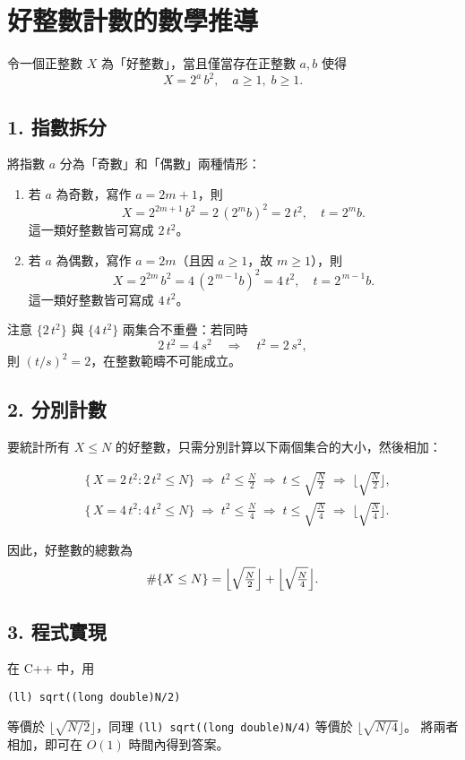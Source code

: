 \section*{好整數計數的數學推導}

令一個正整數 $X$ 為「好整數」，當且僅當存在正整數 $a,b$ 使得
\[
X = 2^a \, b^2,\quad a\ge1,\;b\ge1.
\]

\subsection*{1. 指數拆分}

將指數 $a$ 分為「奇數」和「偶數」兩種情形：

\begin{enumerate}
  \item 若 $a$ 為奇數，寫作 $a=2m+1$，則
    \[
      X = 2^{2m+1}\,b^2
        = 2\,(2^m b)^2
        = 2\,t^2,
      \quad t = 2^m b.
    \]
    這一類好整數皆可寫成 $2\,t^2$。

  \item 若 $a$ 為偶數，寫作 $a=2m$（且因 $a\ge1$，故 $m\ge1$），則
    \[
      X = 2^{2m}\,b^2
        = 4\,(2^{\,m-1}b)^2
        = 4\,t^2,
      \quad t = 2^{\,m-1}b.
    \]
    這一類好整數皆可寫成 $4\,t^2$。
\end{enumerate}

注意 $\{2\,t^2\}$ 與 $\{4\,t^2\}$ 兩集合不重疊：若同時
\[
2\,t^2 = 4\,s^2
\quad\Longrightarrow\quad
t^2 = 2\,s^2,
\]
則 $(t/s)^2=2$，在整數範疇不可能成立。

\subsection*{2. 分別計數}

要統計所有 $X\le N$ 的好整數，只需分別計算以下兩個集合的大小，然後相加：

\[
\begin{aligned}
  &\{\,X=2\,t^2 : 2\,t^2\le N\}
    \;\Longrightarrow\;
    t^2 \le \frac{N}{2}
    \;\Longrightarrow\;
    t \le \sqrt{\frac{N}{2}}
    \;\Longrightarrow\;
    \bigl\lfloor\sqrt{\tfrac{N}{2}}\bigr\rfloor, \\[6pt]
  &\{\,X=4\,t^2 : 4\,t^2\le N\}
    \;\Longrightarrow\;
    t^2 \le \frac{N}{4}
    \;\Longrightarrow\;
    t \le \sqrt{\frac{N}{4}}
    \;\Longrightarrow\;
    \bigl\lfloor\sqrt{\tfrac{N}{4}}\bigr\rfloor.
\end{aligned}
\]

因此，好整數的總數為
\[
\#\{X\le N\}
= \Bigl\lfloor\sqrt{\tfrac{N}{2}}\Bigr\rfloor
+ \Bigl\lfloor\sqrt{\tfrac{N}{4}}\Bigr\rfloor.
\]

\subsection*{3. 程式實現}

在 C++ 中，用
\begin{verbatim}
(ll) sqrt((long double)N/2)
\end{verbatim}
等價於 $\lfloor\sqrt{N/2}\rfloor$，同理
\verb|(ll) sqrt((long double)N/4)| 等價於 $\lfloor\sqrt{N/4}\rfloor$。  
將兩者相加，即可在 $O(1)$ 時間內得到答案。
